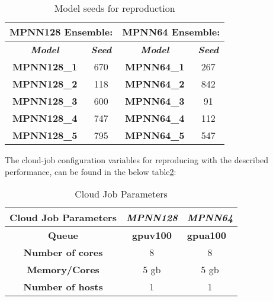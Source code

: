 \begin{table}[H]
    \centering
    \caption{Model seeds for reproduction}
    \label{tab:seeds}
    \begin{tabular}{|cc|cc|}
        \hline
        \multicolumn{2}{|c|}{\textbf{MPNN128 Ensemble:}} & \multicolumn{2}{c|}{\textbf{MPNN64 Ensemble:}}                                                                         \\ \hline
        \multicolumn{1}{|c|}{\textit{\textbf{Model}}}    & \textit{\textbf{Seed}}                         & \multicolumn{1}{c|}{\textit{\textbf{Model}}} & \textit{\textbf{Seed}} \\ \hline
        \multicolumn{1}{|c|}{\textbf{MPNN128\_1}}        & 670                                            & \multicolumn{1}{c|}{\textbf{MPNN64\_1}}      & 267                    \\ \hline
        \multicolumn{1}{|c|}{\textbf{MPNN128\_2}}        & 118                                            & \multicolumn{1}{c|}{\textbf{MPNN64\_2}}      & 842                    \\ \hline
        \multicolumn{1}{|c|}{\textbf{MPNN128\_3}}        & 600                                            & \multicolumn{1}{c|}{\textbf{MPNN64\_3}}      & 91                     \\ \hline
        \multicolumn{1}{|c|}{\textbf{MPNN128\_4}}        & 747                                            & \multicolumn{1}{c|}{\textbf{MPNN64\_4}}      & 112                    \\ \hline
        \multicolumn{1}{|c|}{\textbf{MPNN128\_5}}        & 795                                            & \multicolumn{1}{c|}{\textbf{MPNN64\_5}}      & 547                    \\ \hline
    \end{tabular}
\end{table}

The cloud-job configuration variables for reproducing with the described performance,
can be found in the below table\ref{tab:cloud-job-param}:

\begin{table}[H]
    \centering
    \caption{Cloud Job Parameters}
    \label{tab:cloud-job-param}
    \begin{tabular}{|c|c|c|}
        \hline
        \textbf{Cloud Job Parameters} & \textit{\textbf{MPNN128}} & \textit{\textbf{MPNN64}}              \\ \hline
        \textbf{Queue}                & \textbf{gpuv100}          & \multicolumn{1}{l|}{\textbf{gpua100}} \\ \hline
        \textbf{Number of cores}      & 8                         & 8                                     \\ \hline
        \textbf{Memory/Cores}         & 5 gb                      & 5 gb                                  \\ \hline
        \textbf{Number of hosts}      & 1                         & 1                                     \\ \hline
    \end{tabular}
\end{table}

\newpage
